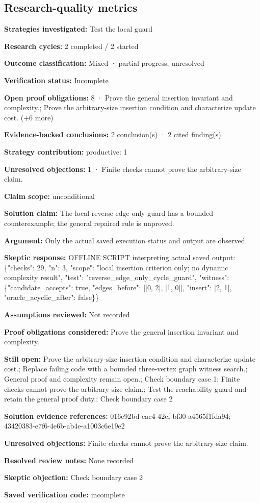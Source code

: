 \documentclass[11pt]{article}
\begin{document}
\subsection{Research-quality metrics}
\textbf{Strategies investigated:} Test the local guard\par
\textbf{Research cycles:} 2 completed / 2 started\par
\textbf{Outcome classification:} Mixed · partial progress, unresolved\par
\textbf{Verification status:} Incomplete\par
\textbf{Open proof obligations:} 8 · Prove the general insertion invariant and complexity.; Prove the arbitrary-size insertion condition and characterize update cost. (+6 more)\par
\textbf{Evidence-backed conclusions:} 2 conclusion(s) · 2 cited finding(s)\par
\textbf{Strategy contribution:} productive: 1\par
\textbf{Unresolved objections:} 1 · Finite checks cannot prove the arbitrary-size claim.\par
\textbf{Claim scope:} unconditional\par
\textbf{Solution claim:} The local reverse-edge-only guard has a bounded counterexample; the general repaired rule is unproved.\par
\textbf{Argument:} Only the actual saved execution status and output are observed.\par
\textbf{Skeptic response:} OFFLINE SCRIPT interpreting actual saved output: \{"checks": 29, "n": 3, "scope": "local insertion criterion only; no dynamic complexity result", "test": "reverse\_edge\_only\_cycle\_guard", "witness": \{"candidate\_accepts": true, "edges\_before": [[0, 2], [1, 0]], "insert": [2, 1], "oracle\_acyclic\_after": false\}\}\par
\textbf{Assumptions reviewed:} Not recorded\par
\textbf{Proof obligations considered:} Prove the general insertion invariant and complexity.\par
\textbf{Still open:} Prove the arbitrary-size insertion condition and characterize update cost.; Replace failing code with a bounded three-vertex graph witness search.; General proof and complexity remain open.; Check boundary case 1; Finite checks cannot prove the arbitrary-size claim.; Test the reachability guard and retain the general proof duty.; Check boundary case 2\par
\textbf{Solution evidence references:} 016e92bd-eac4-42ef-bf30-a4565f1fda94; 43420383-e7f6-4e6b-ab4e-a1003c6e19e2\par
\textbf{Unresolved objections:} Finite checks cannot prove the arbitrary-size claim.\par
\textbf{Resolved review notes:} None recorded\par
\textbf{Skeptic objection:} Check boundary case 2\par
\textbf{Saved verification code:} incomplete\par
\end{document}
